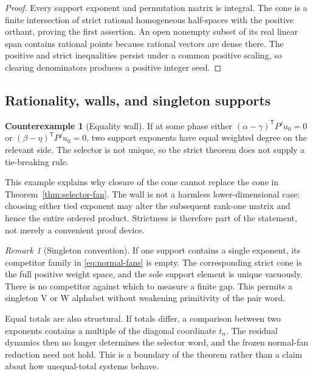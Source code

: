 \documentclass[11pt,letterpaper]{article}
\theoremstyle{definition}
\newtheorem{counterexample}[theorem]{Counterexample}
\theoremstyle{remark}
\newtheorem{remark}[theorem]{Remark}
\numberwithin{equation}{section}
\begin{document}
\begin{proof}
Every support exponent and permutation matrix is integral.  The cone is a
finite intersection of strict rational homogeneous half-spaces with the
positive orthant, proving the first assertion.  An open nonempty subset of
its real linear span contains rational points because rational vectors are
dense there.  The positive and strict inequalities persist under a common
positive scaling, so clearing denominators produces a positive integer
seed.
\end{proof}

\subsection{Rationality, walls, and singleton supports}

\begin{counterexample}[Equality wall]
\label{cex:fan-wall}
If at some phase either
\((\alpha-\gamma)^{\mathsf T}P^ju_0=0\) or
\((\beta-\eta)^{\mathsf T}P^ju_0=0\), two support exponents have equal
weighted degree on the relevant side.  The selector is not unique, so the
strict theorem does not supply a tie-breaking rule.
\end{counterexample}

This example explains why closure of the cone cannot replace the cone in
Theorem~\ref{thm:selector-fan}.  The wall is not a harmless lower-dimensional
case: choosing either tied exponent may alter the subsequent rank-one
matrix and hence the entire ordered product.  Strictness is therefore part
of the statement, not merely a convenient proof device.

\begin{remark}[Singleton convention]
\label{rem:singleton}
If one support contains a single exponent, its competitor family in
\eqref{eq:normal-fans} is empty.  The corresponding strict cone is the full
positive weight space, and the sole support element is unique vacuously.
There is no competitor against which to measure a finite gap.  This permits
a singleton V or W alphabet without weakening primitivity of the pair word.
\end{remark}

Equal totals are also structural.  If totals differ, a comparison between
two exponents contains a multiple of the diagonal coordinate \(t_n\).  The
residual dynamics then no longer determines the selector word, and the
frozen normal-fan reduction need not hold.  This is a boundary of the
theorem rather than a claim about how unequal-total systems behave.
\end{document}
